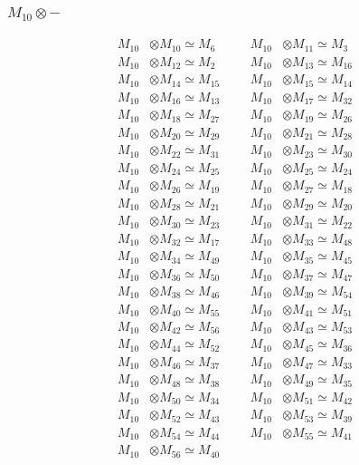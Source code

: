 \subsubsection{$ M_{10}\otimes -$}
\begin{align*}
M_{10} &\otimes M_{10} \simeq M_{6} &&& M_{10} &\otimes M_{11} \simeq M_{3}\\
M_{10} &\otimes M_{12} \simeq M_{2} &&& M_{10} &\otimes M_{13} \simeq M_{16}\\
M_{10} &\otimes M_{14} \simeq M_{15} &&& M_{10} &\otimes M_{15} \simeq M_{14}\\
M_{10} &\otimes M_{16} \simeq M_{13} &&& M_{10} &\otimes M_{17} \simeq M_{32}\\
M_{10} &\otimes M_{18} \simeq M_{27} &&& M_{10} &\otimes M_{19} \simeq M_{26}\\
M_{10} &\otimes M_{20} \simeq M_{29} &&& M_{10} &\otimes M_{21} \simeq M_{28}\\
M_{10} &\otimes M_{22} \simeq M_{31} &&& M_{10} &\otimes M_{23} \simeq M_{30}\\
M_{10} &\otimes M_{24} \simeq M_{25} &&& M_{10} &\otimes M_{25} \simeq M_{24}\\
M_{10} &\otimes M_{26} \simeq M_{19} &&& M_{10} &\otimes M_{27} \simeq M_{18}\\
M_{10} &\otimes M_{28} \simeq M_{21} &&& M_{10} &\otimes M_{29} \simeq M_{20}\\
M_{10} &\otimes M_{30} \simeq M_{23} &&& M_{10} &\otimes M_{31} \simeq M_{22}\\
M_{10} &\otimes M_{32} \simeq M_{17} &&& M_{10} &\otimes M_{33} \simeq M_{48}\\
M_{10} &\otimes M_{34} \simeq M_{49} &&& M_{10} &\otimes M_{35} \simeq M_{45}\\
M_{10} &\otimes M_{36} \simeq M_{50} &&& M_{10} &\otimes M_{37} \simeq M_{47}\\
M_{10} &\otimes M_{38} \simeq M_{46} &&& M_{10} &\otimes M_{39} \simeq M_{54}\\
M_{10} &\otimes M_{40} \simeq M_{55} &&& M_{10} &\otimes M_{41} \simeq M_{51}\\
M_{10} &\otimes M_{42} \simeq M_{56} &&& M_{10} &\otimes M_{43} \simeq M_{53}\\
M_{10} &\otimes M_{44} \simeq M_{52} &&& M_{10} &\otimes M_{45} \simeq M_{36}\\
M_{10} &\otimes M_{46} \simeq M_{37} &&& M_{10} &\otimes M_{47} \simeq M_{33}\\
M_{10} &\otimes M_{48} \simeq M_{38} &&& M_{10} &\otimes M_{49} \simeq M_{35}\\
M_{10} &\otimes M_{50} \simeq M_{34} &&& M_{10} &\otimes M_{51} \simeq M_{42}\\
M_{10} &\otimes M_{52} \simeq M_{43} &&& M_{10} &\otimes M_{53} \simeq M_{39}\\
M_{10} &\otimes M_{54} \simeq M_{44} &&& M_{10} &\otimes M_{55} \simeq M_{41}\\
M_{10} &\otimes M_{56} \simeq M_{40}
\end{align*}

